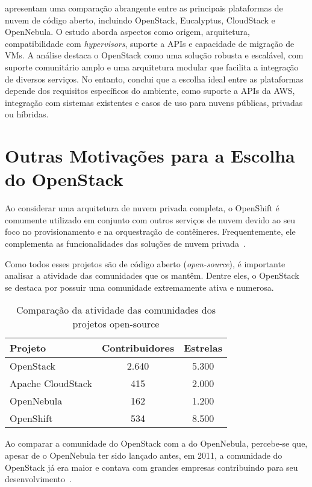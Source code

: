 \cite{kumar2014open} apresentam uma comparação abrangente entre as principais plataformas de nuvem de código aberto, incluindo OpenStack, Eucalyptus, CloudStack e OpenNebula. O estudo aborda aspectos como origem, arquitetura, compatibilidade com \textit{hypervisors}, suporte a APIs e capacidade de migração de VMs. A análise destaca o OpenStack como uma solução robusta e escalável, com suporte comunitário amplo e uma arquitetura modular que facilita a integração de diversos serviços. No entanto, conclui que a escolha ideal entre as plataformas depende dos requisitos específicos do ambiente, como suporte a APIs da AWS, integração com sistemas existentes e casos de uso para nuvens públicas, privadas ou híbridas.



\section{Outras Motivações para a Escolha do OpenStack}

Ao considerar uma arquitetura de nuvem privada completa, o OpenShift é comumente utilizado em conjunto com outros serviços de nuvem devido ao seu foco no provisionamento e na orquestração de contêineres. Frequentemente, ele complementa as funcionalidades das soluções de nuvem privada~\citep{IBMWithOpenShift}.

Como todos esses projetos são de código aberto (\textit{open-source}), é importante analisar a atividade das comunidades que os mantêm. Dentre eles, o OpenStack se destaca por possuir uma comunidade extremamente ativa e numerosa.

\begin{table}[htbp]
    \centering
    \caption{Comparação da atividade das comunidades dos projetos open-source}
    \label{tab:comunidade_projetos}
    \begin{tabular}{|l|c|c|}
        \hline
        \textbf{Projeto} & \textbf{Contribuidores} & \textbf{Estrelas} \\ \hline
        OpenStack & 2.640 & 5.300 \\ \hline
        Apache CloudStack & 415 & 2.000 \\ \hline
        OpenNebula & 162 & 1.200 \\ \hline
        OpenShift & 534 & 8.500 \\ \hline
    \end{tabular}
\end{table}

Ao comparar a comunidade do OpenStack com a do OpenNebula, percebe-se que, apesar de o OpenNebula ter sido lançado antes, em 2011, a comunidade do OpenStack já era maior e contava com grandes empresas contribuindo para seu desenvolvimento~\citep{wen2012comparison}.

